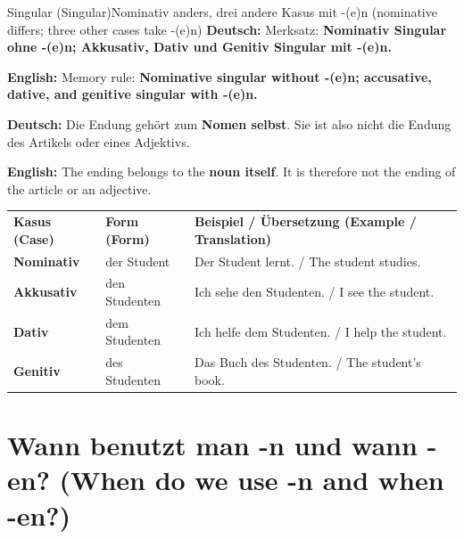 \documentclass[a4paper,11pt]{article}
\newcommand{\GermanText}[1]{\textbf{Deutsch: }#1\par}
\newcommand{\EnglishText}[1]{{\small\color{SoftGray}\textbf{English: }#1\par}}
\begin{document}
        \begin{grammarentry}{Singular \textnormal{(Singular)}}{Nominativ anders, drei andere Kasus mit -(e)n \textnormal{(nominative differs; three other cases take -(e)n)}}
            \GermanText{Merksatz: \textbf{Nominativ Singular ohne -(e)n; Akkusativ, Dativ und Genitiv Singular mit -(e)n.}}
            \EnglishText{Memory rule: \textbf{Nominative singular without -(e)n; accusative, dative, and genitive singular with -(e)n.}}

            \GermanText{Die Endung gehört zum \textbf{Nomen selbst}. Sie ist also nicht die Endung des Artikels oder eines Adjektivs.}
            \EnglishText{The ending belongs to the \textbf{noun itself}. It is therefore not the ending of the article or an adjective.}
        \end{grammarentry}

        \begin{longtable}{>{\bfseries}p{2.8cm}|p{4.4cm}|p{7.0cm}}
            \rowcolor{HeaderBlueDark}
            \color{white}\textbf{Kasus (Case)} & \color{white}\textbf{Form (Form)} & \color{white}\textbf{Beispiel / Übersetzung (Example / Translation)} \\
            Nominativ & der Student & Der Student lernt. / The student studies. \\
            Akkusativ & den Studenten & Ich sehe den Studenten. / I see the student. \\
            Dativ & dem Studenten & Ich helfe dem Studenten. / I help the student. \\
            Genitiv & des Studenten & Das Buch des Studenten. / The student's book. \\
        \end{longtable}

    \section{Wann benutzt man -n und wann -en? \textnormal{(When do we use -n and when -en?)}}
\end{document}
